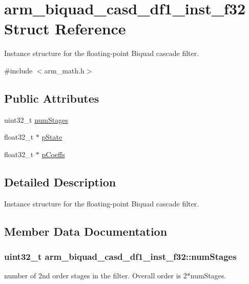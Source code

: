 \hypertarget{structarm__biquad__casd__df1__inst__f32}{}\section{arm\+\_\+biquad\+\_\+casd\+\_\+df1\+\_\+inst\+\_\+f32 Struct Reference}
\label{structarm__biquad__casd__df1__inst__f32}


Instance structure for the floating-\/point Biquad cascade filter.  




{\ttfamily \#include $<$arm\+\_\+math.\+h$>$}

\subsection*{Public Attributes}
\begin{DoxyCompactItemize}
\item 
uint32\+\_\+t \hyperlink{structarm__biquad__casd__df1__inst__f32_af69820c37a87252c46453e4cfe120585}{num\+Stages}
\item 
float32\+\_\+t $\ast$ \hyperlink{structarm__biquad__casd__df1__inst__f32_a8c245d79e0d8cfabc82409d4b54fb682}{p\+State}
\item 
float32\+\_\+t $\ast$ \hyperlink{structarm__biquad__casd__df1__inst__f32_af9df3820576fb921809d1462c9c6d16c}{p\+Coeffs}
\end{DoxyCompactItemize}


\subsection{Detailed Description}
Instance structure for the floating-\/point Biquad cascade filter. 

\subsection{Member Data Documentation}
\subsubsection[{\texorpdfstring{num\+Stages}{numStages}}]{\setlength{\rightskip}{0pt plus 5cm}uint32\+\_\+t arm\+\_\+biquad\+\_\+casd\+\_\+df1\+\_\+inst\+\_\+f32\+::num\+Stages}\hypertarget{structarm__biquad__casd__df1__inst__f32_af69820c37a87252c46453e4cfe120585}{}\label{structarm__biquad__casd__df1__inst__f32_af69820c37a87252c46453e4cfe120585}
number of 2nd order stages in the filter. Overall order is 2$\ast$num\+Stages. 
